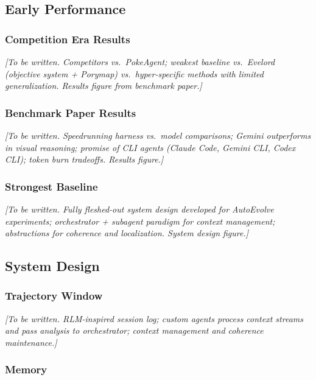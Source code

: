 \subsection{Early Performance}\label{sec:early_performance}

\subsubsection{Competition Era Results}\label{sec:competition_results}

\textit{[To be written. Competitors vs.\ PokeAgent; weakest baseline vs.\ Evelord (objective system + Porymap) vs.\ hyper-specific methods with limited generalization. Results figure from benchmark paper.]}

\subsubsection{Benchmark Paper Results}\label{sec:benchmark_results}

\textit{[To be written. Speedrunning harness vs.\ model comparisons; Gemini outperforms in visual reasoning; promise of CLI agents (Claude Code, Gemini CLI, Codex CLI); token burn tradeoffs. Results figure.]}

\subsubsection{Strongest Baseline}\label{sec:strongest_baseline}

\textit{[To be written. Fully fleshed-out system design developed for AutoEvolve experiments; orchestrator + subagent paradigm for context management; abstractions for coherence and localization. System design figure.]}

\subsection{System Design}\label{sec:system_design}

\subsubsection{Trajectory Window}\label{sec:trajectory_window}

\textit{[To be written. RLM-inspired session log; custom agents process context streams and pass analysis to orchestrator; context management and coherence maintenance.]}

\subsubsection{Memory}\label{sec:memory}

